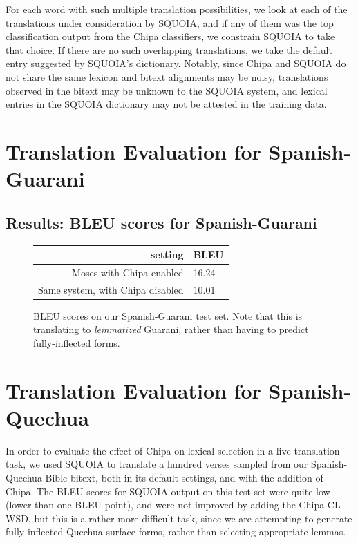 For each word with such multiple translation possibilities, we look at each of
the translations under consideration by SQUOIA, and if any of them was the top 
classification output from the Chipa classifiers, we constrain SQUOIA to take
that choice.
If there are no such overlapping translations, we
take the default entry suggested by SQUOIA's dictionary.
Notably, since Chipa and SQUOIA do not share the same lexicon and bitext alignments
may be noisy, translations
observed in the bitext may be unknown to the SQUOIA system, and lexical entries in the
SQUOIA dictionary may not be attested in the training data.

\section{Translation Evaluation for Spanish-Guarani}


\subsection{Results: BLEU scores for Spanish-Guarani}
\begin{figure}
  \begin{centering}
  \begin{tabulary}{\textwidth}{|R|L|}
    \hline
    setting & BLEU \\
    \hline
    Moses with Chipa enabled &  16.24 \\
    \hline
    Same system, with Chipa disabled &  10.01 \\
    \hline
  \end{tabulary}
  \end{centering}
  \caption{BLEU scores on our Spanish-Guarani test set. Note that this is
  translating to \emph{lemmatized} Guarani, rather than having to predict
  fully-inflected forms.}
  \label{fig:pyramid-extras-results}
\end{figure}


\section{Translation Evaluation for Spanish-Quechua}

In order to evaluate the effect of Chipa on lexical selection in a live
translation task, we used SQUOIA to translate a hundred verses sampled from our
Spanish-Quechua Bible bitext, both in its default settings, and with the
addition of Chipa. The BLEU scores for SQUOIA output on this test set were
quite low (lower than one BLEU point), and were not improved by adding the
Chipa CL-WSD, but this is a rather more difficult task, since we are attempting
to generate fully-inflected Quechua surface forms, rather than selecting
appropriate lemmas.

